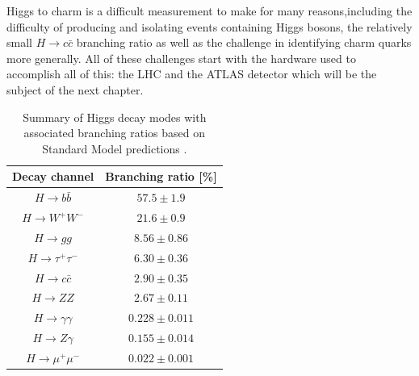 Higgs to charm is a difficult measurement to make for many reasons,including the difficulty of producing and 
isolating events containing Higgs bosons, the relatively small $H \rightarrow c\bar{c}$ branching ratio as well as the 
challenge in identifying charm quarks more generally. All of these challenges start with the hardware used to 
accomplish all of this: the LHC and the ATLAS detector which will be the subject of the next chapter.

\begin{table}
\begin{center}
\caption{Summary of Higgs decay modes with associated branching ratios based on Standard Model predictions \cite{atlas-higgs-decay}.}
\label{table-higgs-decay}
\begin{tabular}{|c c|} 
 \hline
 Decay channel & Branching ratio [\%] \\ [0.5ex] 
 \hline
 $H \rightarrow b\bar{b}$ & $57.5 \pm 1.9$ \\ 
 $H \rightarrow W^+W^-$ & $21.6 \pm 0.9$ \\ 
 $H \rightarrow gg$ & $8.56 \pm 0.86$ \\ 
 $H \rightarrow \tau^+\tau^-$ & $6.30 \pm 0.36$ \\ 
 $H \rightarrow c\bar{c}$ & $2.90 \pm 0.35$ \\
 $H \rightarrow ZZ$ & $2.67 \pm 0.11$ \\
 $H \rightarrow \gamma\gamma$ & $0.228 \pm 0.011$ \\
 $H \rightarrow Z\gamma$ & $0.155 \pm 0.014$ \\
 $H \rightarrow \mu^+\mu^-$ & $0.022 \pm 0.001$ \\
 \hline
\end{tabular}
\end{center}
\end{table}